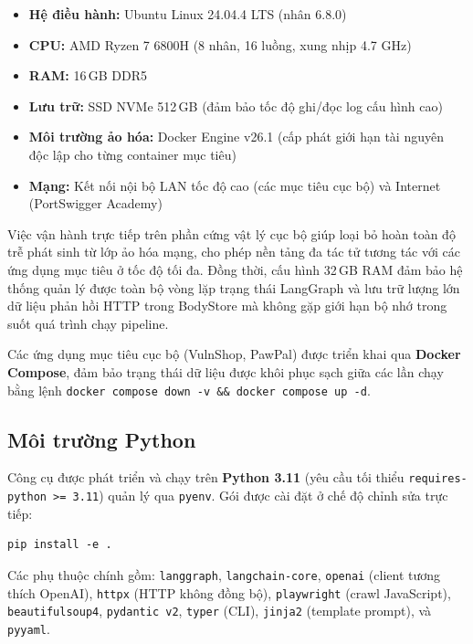 \begin{itemize}
    \item \textbf{Hệ điều hành:} Ubuntu Linux 24.04.4 LTS (nhân 6.8.0)
    \item \textbf{CPU:} AMD Ryzen 7 6800H (8 nhân, 16 luồng, xung nhịp 4.7 GHz)
    \item \textbf{RAM:} 16\,GB DDR5
    \item \textbf{Lưu trữ:} SSD NVMe 512\,GB (đảm bảo tốc độ ghi/đọc log cấu hình cao)
    \item \textbf{Môi trường ảo hóa:} Docker Engine v26.1 (cấp phát giới hạn tài nguyên độc lập cho từng container mục tiêu)
    \item \textbf{Mạng:} Kết nối nội bộ LAN tốc độ cao (các mục tiêu cục bộ) và Internet (PortSwigger Academy)
\end{itemize}

Việc vận hành trực tiếp trên phần cứng vật lý cục bộ giúp loại bỏ hoàn toàn độ trễ phát sinh từ lớp ảo hóa mạng, cho phép nền tảng đa tác tử tương tác với các ứng dụng mục tiêu ở tốc độ tối đa. Đồng thời, cấu hình 32\,GB RAM đảm bảo hệ thống quản lý được toàn bộ vòng lặp trạng thái LangGraph và lưu trữ lượng lớn dữ liệu phản hồi HTTP trong BodyStore mà không gặp giới hạn bộ nhớ trong suốt quá trình chạy pipeline.

Các ứng dụng mục tiêu cục bộ (VulnShop, PawPal) được triển khai qua \textbf{Docker Compose}, đảm bảo trạng thái dữ liệu được khôi phục sạch giữa các lần chạy bằng lệnh \texttt{docker compose down -v \&\& docker compose up -d}.

\subsection{Môi trường Python}

Công cụ được phát triển và chạy trên \textbf{Python 3.11} (yêu cầu tối thiểu \texttt{requires-python >= 3.11}) quản lý qua \texttt{pyenv}. Gói được cài đặt ở chế độ chỉnh sửa trực tiếp:

\begin{verbatim}
pip install -e .
\end{verbatim}

Các phụ thuộc chính gồm: \texttt{langgraph}, \texttt{langchain-core}, \texttt{openai} (client tương thích OpenAI), \texttt{httpx} (HTTP không đồng bộ), \texttt{playwright} (crawl JavaScript), \texttt{beautifulsoup4}, \texttt{pydantic~v2}, \texttt{typer} (CLI), \texttt{jinja2} (template prompt), và \texttt{pyyaml}.

